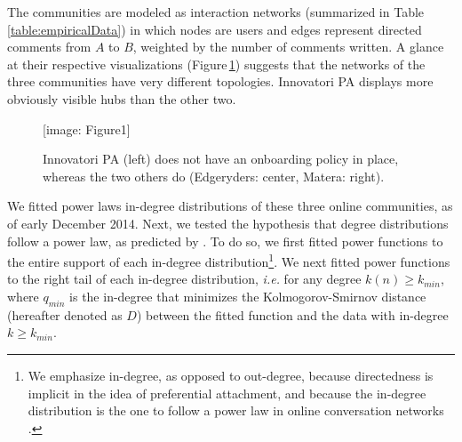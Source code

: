 \documentclass{bmcart}
\def\texttt{[image: ]}
\begin{document}
The communities are modeled as interaction networks (summarized in Table \ref{table:empiricalData}) in which nodes are users and edges represent directed comments from $A$ to $B$, weighted by the number of comments written. A glance at their respective visualizations (Figure\,\ref{fig:NetViz}) suggests that the networks of the three communities have very different topologies. Innovatori PA displays more obviously visible hubs than the other two. 

\begin{figure}[h!]
\texttt{[image: Figure1]}
\caption{ Innovatori PA (left) does not have an onboarding policy in place, whereas the two others do (Edgeryders: center, Matera: right).}
\label{fig:NetViz}
\end{figure}


We fitted power laws in-degree distributions of these three online communities, as of early December 2014. Next, we tested the hypothesis that degree distributions follow a power law, as predicted by \cite{dorogovtsev2002evolution}. To do so, we first fitted power functions to the entire support of each in-degree distribution\footnote{We emphasize in-degree, as opposed to out-degree, 
because directedness is implicit in the idea of preferential attachment, and because the in-degree distribution is the one to follow a power law in online conversation networks \cite{dorogovtsev2002evolution}.
}. We next fitted power functions to the right tail of each in-degree distribution, \emph{i.e.} for any degree $k(n) \geq k_{min}$, where $q_{min}$ is the in-degree that minimizes the Kolmogorov-Smirnov distance (hereafter denoted as $D$) between the fitted function and the data with in-degree $k \geq k_{min}$. 
\end{document}
